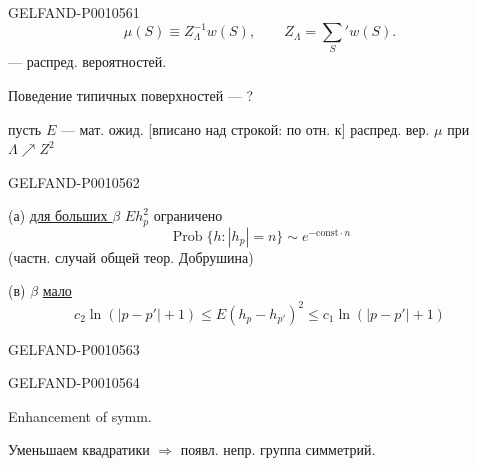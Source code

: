 \begin{GelfandAdjacentEvidence}{GELFAND-P001056}{1}
\begin{equation*}
\mu(S)\equiv Z_\Lambda^{-1}w(S),\qquad Z_\Lambda=\sum_S' w(S).
\tag{4}
\end{equation*}
— распред. вероятностей.

Поведение типичных поверхностей — ?

 пусть \(E\) — мат. ожид. [вписано над строкой: по отн. к] распред. вер. \(\mu\) при \(\Lambda\nearrow Z^2\)
\end{GelfandAdjacentEvidence}
\begin{GelfandAdjacentEvidence}{GELFAND-P001056}{2}


(а) \underline{для больших \(\beta\)} \(Eh_p^2\) ограничено
\begin{equation*}
\operatorname{Prob}\{h:|h_p|=n\}\sim e^{-\mathrm{const}\cdot n}
\tag{5}
\end{equation*}
(частн. случай общей теор. Добрушина)

(в) \(\beta\) \underline{мало}
\begin{equation*}
c_2\ln(|p-p'|+1)\leqslant E(h_p-h_{p'})^2\leqslant c_1\ln(|p-p'|+1)
\tag{6}
\end{equation*}
\end{GelfandAdjacentEvidence}
\begin{GelfandAdjacentEvidence}{GELFAND-P001056}{3}

\end{GelfandAdjacentEvidence}
\begin{GelfandAdjacentEvidence}{GELFAND-P001056}{4}


Enhancement of symm.

Уменьшаем квадратики \(\Rightarrow\) появл. непр. группа симметрий.
\end{GelfandAdjacentEvidence}

